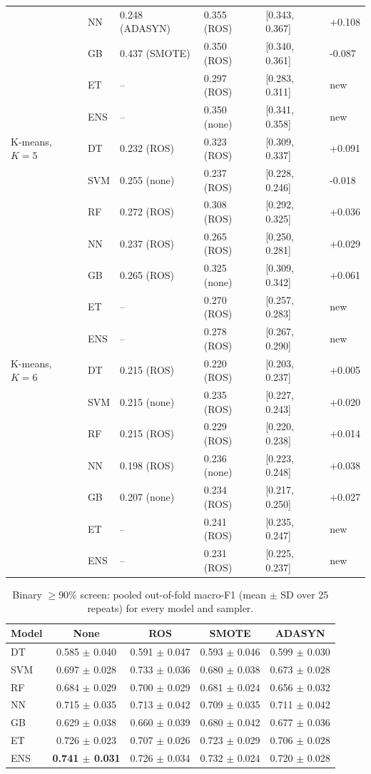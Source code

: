 \documentclass[11pt,a4paper]{article}
\begin{document}
\begin{table}[!htbp]
\begin{tabular}{llllll}
 & NN & 0.248 (ADASYN) & 0.355 (ROS) & [0.343, 0.367] & +0.108 \\
 & GB & 0.437 (SMOTE) & 0.350 (ROS) & [0.340, 0.361] & -0.087 \\
 & ET & -- & 0.297 (ROS) & [0.283, 0.311] & new \\
 & ENS & -- & 0.350 (none) & [0.341, 0.358] & new \\
\midrule
K-means, $K=5$ & DT & 0.232 (ROS) & 0.323 (ROS) & [0.309, 0.337] & +0.091 \\
 & SVM & 0.255 (none) & 0.237 (ROS) & [0.228, 0.246] & -0.018 \\
 & RF & 0.272 (ROS) & 0.308 (ROS) & [0.292, 0.325] & +0.036 \\
 & NN & 0.237 (ROS) & 0.265 (ROS) & [0.250, 0.281] & +0.029 \\
 & GB & 0.265 (ROS) & 0.325 (none) & [0.309, 0.342] & +0.061 \\
 & ET & -- & 0.270 (ROS) & [0.257, 0.283] & new \\
 & ENS & -- & 0.278 (ROS) & [0.267, 0.290] & new \\
\midrule
K-means, $K=6$ & DT & 0.215 (ROS) & 0.220 (ROS) & [0.203, 0.237] & +0.005 \\
 & SVM & 0.215 (none) & 0.235 (ROS) & [0.227, 0.243] & +0.020 \\
 & RF & 0.215 (ROS) & 0.229 (ROS) & [0.220, 0.238] & +0.014 \\
 & NN & 0.198 (ROS) & 0.236 (none) & [0.223, 0.248] & +0.038 \\
 & GB & 0.207 (none) & 0.234 (ROS) & [0.217, 0.250] & +0.027 \\
 & ET & -- & 0.241 (ROS) & [0.235, 0.247] & new \\
 & ENS & -- & 0.231 (ROS) & [0.225, 0.237] & new \\
\bottomrule
\end{tabular}
\end{table}
\begin{table}[!htbp]
\centering\small
\caption{Binary $\geq$90\% screen: pooled out-of-fold macro-F1 (mean $\pm$ SD over 25 repeats) for every model and sampler.}
\label{tab:binary}
\begin{tabular}{lcccc}
\toprule
Model & None & ROS & SMOTE & ADASYN \\
\midrule
DT & 0.585 $\pm$ 0.040 & 0.591 $\pm$ 0.047 & 0.593 $\pm$ 0.046 & 0.599 $\pm$ 0.030 \\
SVM & 0.697 $\pm$ 0.028 & 0.733 $\pm$ 0.036 & 0.680 $\pm$ 0.038 & 0.673 $\pm$ 0.028 \\
RF & 0.684 $\pm$ 0.029 & 0.700 $\pm$ 0.029 & 0.681 $\pm$ 0.024 & 0.656 $\pm$ 0.032 \\
NN & 0.715 $\pm$ 0.035 & 0.713 $\pm$ 0.042 & 0.709 $\pm$ 0.035 & 0.711 $\pm$ 0.042 \\
GB & 0.629 $\pm$ 0.038 & 0.660 $\pm$ 0.039 & 0.680 $\pm$ 0.042 & 0.677 $\pm$ 0.036 \\
ET & 0.726 $\pm$ 0.023 & 0.707 $\pm$ 0.026 & 0.723 $\pm$ 0.029 & 0.706 $\pm$ 0.028 \\
ENS & \textbf{0.741 $\pm$ 0.031} & 0.726 $\pm$ 0.034 & 0.732 $\pm$ 0.024 & 0.720 $\pm$ 0.028 \\
\bottomrule
\end{tabular}
\end{table}
\end{document}
